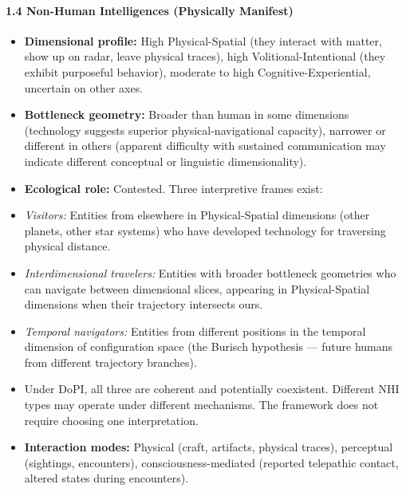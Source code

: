 \paragraph*{1.4 Non-Human Intelligences (Physically Manifest)}

\begin{itemize}[nosep,leftmargin=*]
  \item \textbf{Dimensional profile:} High Physical-Spatial (they interact with matter, show up on radar, leave physical traces), high Volitional-Intentional (they exhibit purposeful behavior), moderate to high Cognitive-Experiential, uncertain on other axes.
  \item \textbf{Bottleneck geometry:} Broader than human in some dimensions (technology suggests superior physical-navigational capacity), narrower or different in others (apparent difficulty with sustained communication may indicate different conceptual or linguistic dimensionality).
  \item \textbf{Ecological role:} Contested. Three interpretive frames exist:
  \item \textit{Visitors:} Entities from elsewhere in Physical-Spatial dimensions (other planets, other star systems) who have developed technology for traversing physical distance.
  \item \textit{Interdimensional travelers:} Entities with broader bottleneck geometries who can navigate between dimensional slices, appearing in Physical-Spatial dimensions when their trajectory intersects ours.
  \item \textit{Temporal navigators:} Entities from different positions in the temporal dimension of configuration space (the Burisch hypothesis — future humans from different trajectory branches).
  \item Under DoPI, all three are coherent and potentially coexistent. Different NHI types may operate under different mechanisms. The framework does not require choosing one interpretation.
  \item \textbf{Interaction modes:} Physical (craft, artifacts, physical traces), perceptual (sightings, encounters), consciousness-mediated (reported telepathic contact, altered states during encounters).

\end{itemize}
